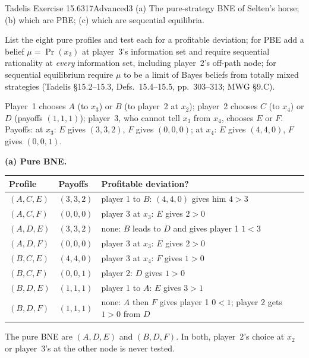 \begin{exsol}{Tadelis Exercise 15.6}{317}{Advanced}{3}
\asked (a) The pure-strategy BNE of Selten's horse; (b) which are PBE; (c) which are sequential
equilibria.

\method List the eight pure profiles and test each for a profitable deviation; for PBE add a belief
$\mu = \Pr(x_3)$ at player~3's information set and require sequential rationality at \emph{every}
information set, including player~2's off-path node; for sequential equilibrium require $\mu$ to be a
limit of Bayes beliefs from totally mixed strategies (Tadelis \S15.2--15.3, Defs.~15.4--15.5,
pp.~303--313; MWG \S9.C).

\solution Player~1 chooses $A$ (to $x_3$) or $B$ (to player~2 at $x_2$); player~2 chooses $C$ (to $x_4$)
or $D$ (payoffs $(1,1,1)$); player~3, who cannot tell $x_3$ from $x_4$, chooses $E$ or $F$. Payoffs:
at $x_3$: $E$ gives $(3,3,2)$, $F$ gives $(0,0,0)$; at $x_4$: $E$ gives $(4,4,0)$, $F$ gives $(0,0,1)$.

\textbf{(a) Pure BNE.}
\begin{center}
\begin{tabular}{lll}
\toprule
Profile & Payoffs & Profitable deviation? \\
\midrule
$(A, C, E)$ & $(3,3,2)$ & player 1 to $B$: $(4,4,0)$ gives him $4 > 3$ \\
$(A, C, F)$ & $(0,0,0)$ & player 3 at $x_3$: $E$ gives $2 > 0$ \\
$(A, D, E)$ & $(3,3,2)$ & none: $B$ leads to $D$ and gives player 1 $1 < 3$ \\
$(A, D, F)$ & $(0,0,0)$ & player 3 at $x_3$: $E$ gives $2 > 0$ \\
$(B, C, E)$ & $(4,4,0)$ & player 3 at $x_4$: $F$ gives $1 > 0$ \\
$(B, C, F)$ & $(0,0,1)$ & player 2: $D$ gives $1 > 0$ \\
$(B, D, E)$ & $(1,1,1)$ & player 1 to $A$: $E$ gives $3 > 1$ \\
$(B, D, F)$ & $(1,1,1)$ & none: $A$ then $F$ gives player 1 $0 < 1$; player 2 gets $1 > 0$ from $D$ \\
\bottomrule
\end{tabular}
\end{center}
The pure BNE are $(A, D, E)$ and $(B, D, F)$. In both, player~2's choice at $x_2$ or player~3's at
the other node is never tested.


\end{exsol}

